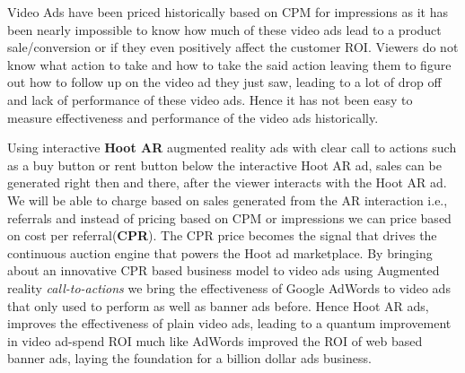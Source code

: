 Video Ads have been priced historically based on CPM for impressions as it has been nearly impossible to know how much of these video ads lead to a product sale/conversion or if they even positively affect the customer ROI. Viewers do not know what action to take and how to take the said action leaving them to figure out how to follow up on the video ad they just saw, leading to a lot of drop off and lack of performance of these video ads. Hence it has not been easy  to measure effectiveness and performance of the video ads historically.

Using interactive \textbf{Hoot AR} augmented reality  ads with clear
call to actions such as a buy button or rent button below the
interactive Hoot AR ad, sales can be generated right then and there,
after the viewer interacts with the Hoot AR ad. We will be able to
charge based on sales generated from the AR interaction i.e.,
referrals and instead of pricing based on CPM or impressions we can
price based on  cost per referral(\textbf{CPR}). The CPR price becomes
the signal that drives the continuous auction engine that powers the
Hoot ad marketplace. By bringing about an innovative CPR based
business model to video ads using Augmented reality
\emph{call-to-actions} we bring the effectiveness of Google AdWords to
video ads that only used to perform as well as banner ads
before. Hence Hoot AR ads, improves the effectiveness of plain video
ads, leading to a quantum improvement in video ad-spend ROI much like
AdWords improved the ROI of web based banner ads, laying the
foundation for a billion dollar ads business.
